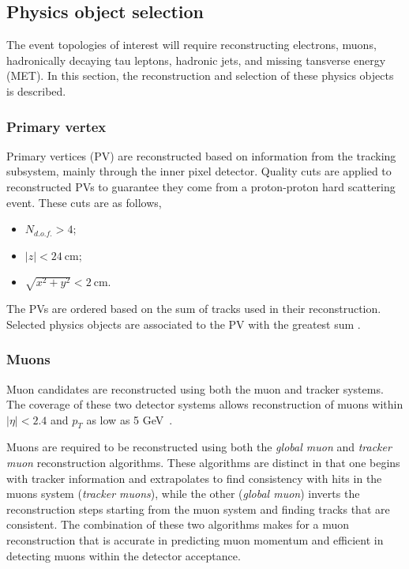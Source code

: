 \subsection{Physics object selection}
\label{sec:objects}

The event topologies of interest will require reconstructing electrons,
muons, hadronically decaying tau leptons, hadronic jets, and missing
tansverse energy (MET).  In this section, the reconstruction and
selection of these physics objects is described.

\FloatBarrier
\subsubsection{Primary vertex}
\label{sec:pv}

Primary vertices (PV) are reconstructed based on information from the
tracking subsystem, mainly through the inner pixel detector.
Quality cuts are applied to reconstructed PVs to guarantee they come
from a proton-proton hard scattering event.  These cuts are
as follows,

\begin{itemize}
    \item $N_{d.o.f.}> 4$;
    \item $\left|z\right| < 24~\mathrm{cm}$; 
    \item $\sqrt{x^{2} + y^{2}} < 2~\mathrm{cm}$.
\end{itemize}

The PVs are ordered based on the sum \pt of tracks used in their
reconstruction.  Selected physics objects are associated to the PV with
the greatest sum \pt. 

\FloatBarrier
\subsubsection{Muons}
\label{sec:muons}

Muon candidates are reconstructed using both the muon and tracker
systems.  The coverage of these two detector systems allows
reconstruction of muons within $\left|\eta\right| < 2.4$ and $p_{T}$ as
low as 5 GeV~\cite{Chatrchyan:2012xi}. 

Muons are required to be reconstructed using both the \emph{global muon}
and \emph{tracker muon} reconstruction algorithms.  These algorithms are
distinct in that one begins with tracker information and extrapolates to
find consistency with hits in the muons system (\emph{tracker muons}),
while the other (\emph{global muon}) inverts the reconstruction steps
starting from the muon system and finding tracks that are
consistent.  The combination of these two algorithms makes for a
muon reconstruction that is accurate in predicting muon momentum and
efficient in detecting muons within the detector acceptance.

